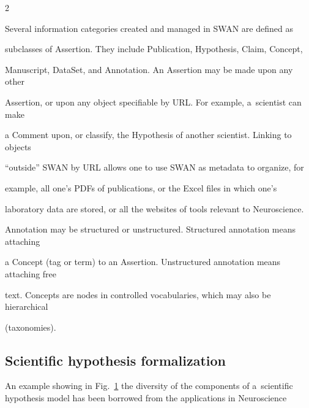 \begin{multicols}{2}
\begin{figure}[b]
\begin{center}
{ 


 }


 \end{center}


 \vspace*{-9pt}




  \label{f6-kl}


  \end{figure}





  Several information categories created and managed in SWAN are defined as


subclasses of Assertion. They include Publication, Hypothesis, Claim, Concept,


Manuscript, DataSet, and Annotation. An Assertion may be made upon any other


Assertion, or upon any object specifiable by URL. For example, a~scientist can make


a Comment upon, or classify, the Hypothesis of another scientist. Linking to objects


``outside'' SWAN  by URL allows one to use SWAN as metadata to organize, for


example, all one's PDFs of publications, or the Excel files in which one's


laboratory data are stored, or all the websites of tools  relevant to Neuroscience.


Annotation may be structured or unstructured. Structured annotation means attaching


a Concept (tag or term) to an Assertion. Unstructured annotation means attaching free


text. Concepts are nodes in controlled vocabularies, which may also be hierarchical


(taxonomies).





\subsection{Scientific hypothesis formalization}





  \noindent


  An example showing in Fig.~\ref{f6-kl} the diversity of the components of a~scientific hypothesis model has been borrowed from the applications in Neuroscience



\end{multicols}
